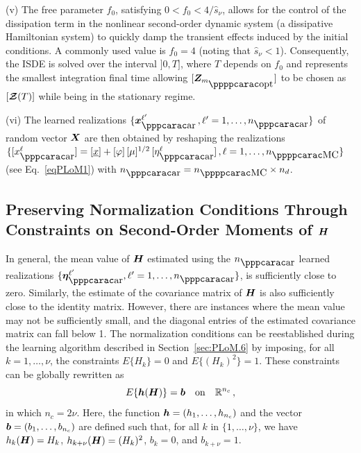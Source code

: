 \noindent (v)  The free parameter $f_0$, satisfying $0 < f_0 < 4/\hat s_{\nu}$, allows for the control of the dissipation term in the nonlinear second-order dynamic system (a dissipative Hamiltonian system) to quickly damp the transient effects induced by the initial conditions. A commonly used value is  $f_0=4$ (noting that $\hat s_{\nu}< 1$). Consequently, the ISDE is solved over the interval  $]0, T]$, where $T$ depends on $f_0$ and represents the smallest integration final time allowing ${[\bfZ_{m_\popt}]}$ to be chosen as $[\boldsymbol{\mathcal{Z}}(T)]$ while being in the stationary regime.

\smallskip

\noindent (vi) The learned realizations $\{\bfx_\ar^{\ell'}\, ,\ell' =1,\ldots,n_\ar \}$ of random vector ${\boldsymbol{X}}$ are then obtained 
by reshaping the realizations $\{[x_\ar^\ell] = [\underline x] + [\varphi]\, [\mu]^{1/2}\, [\eta_\ar^\ell]\, , \ell =1,\ldots,n_\MC\} $
(see Eq.~\eqref{eqPLoM1}) with $n_\ar = n_\MC\times n_d$.

\subsection[Preserving Normalization Conditions Through Constraints on Second-Order Moments of H]{Preserving Normalization Conditions Through Constraints on Second-Order Moments of ${\boldsymbol{H}}$}
\label{sec:PLoM.7}
%
In general, the mean value of ${\boldsymbol{H}}$ estimated using the $n_\ar$ learned realizations $\{\bfeta_\ar^{\ell'},\ell'=1,\ldots,n_\ar\}$, is sufficiently close to zero. Similarly, the estimate of the covariance matrix of ${\boldsymbol{H}}$ is also sufficiently close to the identity matrix. However, there are instances where the mean value may not be sufficiently small, and the diagonal entries of the estimated covariance matrix can fall below 1.  The normalization conditions can be reestablished during the learning algorithm described in Section~\ref{sec:PLoM.6} by imposing, for all $k = 1, \ldots, \nu$, the constraints $E\{H_k\} = 0$ and $E\{(H_k)^2\} = 1$. These constraints can be globally rewritten as
%
\begin{equation} \label{eqPLoM8}
E\{{\boldsymbol{h}}({\boldsymbol{H}})\} = {\boldsymbol{b}}  \quad {\rm on} \quad {\mathbb{R}}^{n_c}\, ,
\end{equation}
%
in which $n_c=2 \nu$. Here, the function ${\boldsymbol{h}} = (h_1,\ldots ,h_{n_c})$ and the vector ${\boldsymbol{b}} = (b_1,\ldots , b_{n_c})$ are defined such that, for all $k$ in $\{1,\ldots , \nu\}$, we have $h_{k}({\boldsymbol{H}}) = H_k$, $h_{k+\nu}({\boldsymbol{H}}) = (H_k)^2$, $b_k =0$, and $b_{k+\nu} =1$.\\


